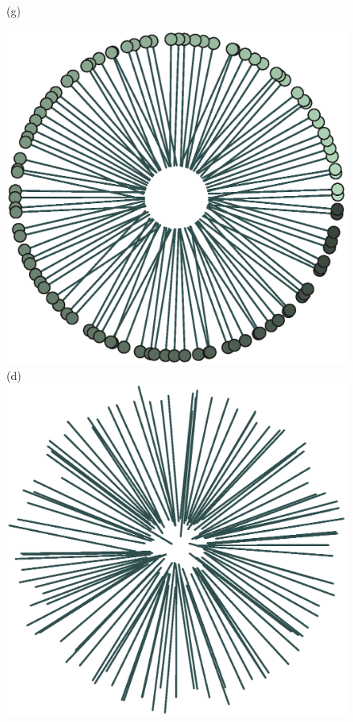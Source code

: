 \begin{figure}[!t]
\begin{minipage}[t]{0.25\textwidth}
		(g)
	\end{minipage}%
	\begin{minipage}[t]{0.25\textwidth}
		\centering
		\includegraphics[width=0.9\columnwidth]{./figs/plusone_reruns_0.eps}\\
		(d)\\ \vspace{0.5cm}
		\includegraphics[width=0.9\columnwidth]{./figs/plusone_reruns_1.eps}\\

\end{minipage}
\end{figure}
